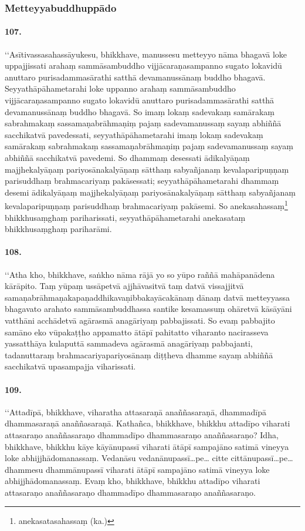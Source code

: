 \subsubsection{Metteyyabuddhuppādo}

\paragraph{107.} ‘‘Asītivassasahassāyukesu, bhikkhave, manussesu metteyyo nāma bhagavā loke uppajjissati arahaṃ sammāsambuddho vijjācaraṇasampanno sugato lokavidū anuttaro purisadammasārathi satthā devamanussānaṃ buddho bhagavā. Seyyathāpāhametarahi loke uppanno arahaṃ sammāsambuddho vijjācaraṇasampanno sugato lokavidū anuttaro purisadammasārathi satthā devamanussānaṃ buddho bhagavā. So imaṃ lokaṃ sadevakaṃ samārakaṃ sabrahmakaṃ sassamaṇabrāhmaṇiṃ pajaṃ sadevamanussaṃ sayaṃ abhiññā sacchikatvā pavedessati, seyyathāpāhametarahi imaṃ lokaṃ sadevakaṃ samārakaṃ sabrahmakaṃ sassamaṇabrāhmaṇiṃ pajaṃ sadevamanussaṃ sayaṃ abhiññā sacchikatvā pavedemi. So dhammaṃ desessati ādikalyāṇaṃ majjhekalyāṇaṃ pariyosānakalyāṇaṃ sātthaṃ sabyañjanaṃ kevalaparipuṇṇaṃ parisuddhaṃ brahmacariyaṃ pakāsessati; seyyathāpāhametarahi dhammaṃ desemi ādikalyāṇaṃ majjhekalyāṇaṃ pariyosānakalyāṇaṃ sātthaṃ sabyañjanaṃ kevalaparipuṇṇaṃ parisuddhaṃ brahmacariyaṃ pakāsemi. So anekasahassaṃ\footnote{anekasatasahassaṃ (ka.)} bhikkhusaṃghaṃ pariharissati, seyyathāpāhametarahi anekasataṃ bhikkhusaṃghaṃ pariharāmi.

\paragraph{108.} ‘‘Atha kho, bhikkhave, saṅkho nāma rājā yo so yūpo raññā mahāpanādena kārāpito. Taṃ yūpaṃ ussāpetvā ajjhāvasitvā taṃ datvā vissajjitvā samaṇabrāhmaṇakapaṇaddhikavaṇibbakayācakānaṃ dānaṃ datvā metteyyassa bhagavato arahato sammāsambuddhassa santike kesamassuṃ ohāretvā kāsāyāni vatthāni acchādetvā agārasmā anagāriyaṃ pabbajissati. So evaṃ pabbajito samāno eko vūpakaṭṭho appamatto ātāpī pahitatto viharanto nacirasseva yassatthāya kulaputtā sammadeva agārasmā anagāriyaṃ pabbajanti, tadanuttaraṃ brahmacariyapariyosānaṃ diṭṭheva dhamme sayaṃ abhiññā sacchikatvā upasampajja viharissati.

\paragraph{109.} ‘‘Attadīpā, bhikkhave, viharatha attasaraṇā anaññasaraṇā, dhammadīpā dhammasaraṇā anaññasaraṇā. Kathañca, bhikkhave, bhikkhu attadīpo viharati attasaraṇo anaññasaraṇo dhammadīpo dhammasaraṇo anaññasaraṇo? Idha, bhikkhave, bhikkhu kāye kāyānupassī viharati ātāpī sampajāno satimā vineyya loke abhijjhādomanassaṃ. Vedanāsu vedanānupassī…pe… citte cittānupassī…pe… dhammesu dhammānupassī viharati ātāpī sampajāno satimā vineyya loke abhijjhādomanassaṃ. Evaṃ kho, bhikkhave, bhikkhu attadīpo viharati attasaraṇo anaññasaraṇo dhammadīpo dhammasaraṇo anaññasaraṇo.

